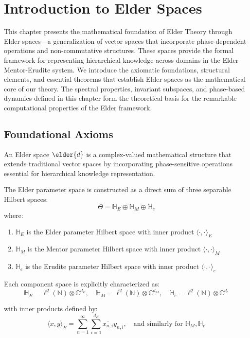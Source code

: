 \chapter{Introduction to Elder Spaces}

\begin{tcolorbox}[colback=DarkSkyBlue!5!white,colframe=DarkSkyBlue!75!black,title=Chapter Summary]
This chapter presents the mathematical foundation of Elder Theory through Elder spaces—a generalization of vector spaces that incorporate phase-dependent operations and non-commutative structures. These spaces provide the formal framework for representing hierarchical knowledge across domains in the Elder-Mentor-Erudite system. We introduce the axiomatic foundations, structural elements, and essential theorems that establish Elder spaces as the mathematical core of our theory. The spectral properties, invariant subspaces, and phase-based dynamics defined in this chapter form the theoretical basis for the remarkable computational properties of the Elder framework.
\end{tcolorbox}

\section{Foundational Axioms}

An Elder space $\elder{d}$ is a complex-valued mathematical structure that extends traditional vector spaces by incorporating phase-sensitive operations essential for hierarchical knowledge representation.

\begin{definition}
The Elder parameter space is constructed as a direct sum of three separable Hilbert spaces:
$$\Theta = \mathbb{H}_E \oplus \mathbb{H}_M \oplus \mathbb{H}_e$$
where:
\begin{enumerate}
    \item $\mathbb{H}_E$ is the Elder parameter Hilbert space with inner product $\langle \cdot, \cdot \rangle_E$
    \item $\mathbb{H}_M$ is the Mentor parameter Hilbert space with inner product $\langle \cdot, \cdot \rangle_M$ 
    \item $\mathbb{H}_e$ is the Erudite parameter Hilbert space with inner product $\langle \cdot, \cdot \rangle_e$
\end{enumerate}

Each component space is explicitly characterized as:
$$\mathbb{H}_E = \ell^2(\mathbb{N}) \otimes \mathbb{C}^{d_E}, \quad \mathbb{H}_M = \ell^2(\mathbb{N}) \otimes \mathbb{C}^{d_M}, \quad \mathbb{H}_e = \ell^2(\mathbb{N}) \otimes \mathbb{C}^{d_e}$$

with inner products defined by:
$$\langle x, y \rangle_E = \sum_{n=1}^{\infty} \sum_{i=1}^{d_E} \overline{x_{n,i}} y_{n,i}, \quad \text{and similarly for } \mathbb{H}_M, \mathbb{H}_e$$
\end{definition}


